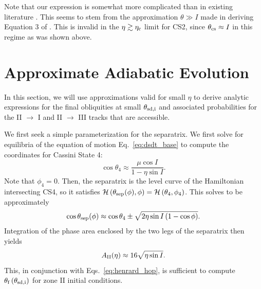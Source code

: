 \documentclass[
        fleqn,
        usenatbib,
    ]{mnras}
\newcommand*{\p}[1]{\left(#1\right)}
\begin{document}
Note that our expression is somewhat more complicated than in existing
literature \citep{millholland_disk,ward2004II}. This seems to stem from the
approximation $\theta \gg I$ made in deriving Equation 3 of
\citet{ward2004II}. This is invalid in the $\eta \gtrsim \eta_{\rm c}$ limit for
CS2, since $\theta_{\rm cs} \approx I$ in this regime as was shown above.

\section{Approximate Adiabatic Evolution}\label{s:ad_approx}

In this section, we will use approximations valid for small $\eta$ to derive
analytic expressions for the final obliquities at small $\theta_{\rm sd, i}$ and
associated probabilities for the II $\to$ I and II $\to$ III tracks that are
accessible.

We first seek a simple parameterization for the separatrix. We first solve for
equilibria of the equation of motion Eq.~\eqref{eq:dsdt_base} to compute the
coordinates for Cassini State 4:
\begin{equation}
    \cos \theta_4 \approx \frac{\mu \cos I}{1 - \eta \sin I}.
\end{equation}
Note that $\phi_4 = 0$. Then, the separatrix is the level curve of the
Hamiltonian intersecting CS4, so it satisfies $\mathcal{H}\p{\theta_{\rm
sep}(\phi), \phi} = \mathcal{H}\p{\theta_4, \phi_4}$. This solves to be
approximately
\begin{equation}
    \cos \theta_{\rm sep}(\phi) \approx \cos \theta_4 \pm
        \sqrt{2\eta \sin I\p{1 - \cos \phi}}.
\end{equation}
Integration of the phase area enclosed by the two legs of the separatrix then
yields
\begin{equation}
    A_{\rm II}(\eta) \approx 16\sqrt{\eta \sin I}.\label{eq:a_approx}
\end{equation}
This, in conjunction with Eqs.~\eqref{eq:henrard_hop}, is sufficient to compute
$\theta_{\rm f}\p{\theta_{\rm sd, i}}$ for zone II initial conditions.
\end{document}
